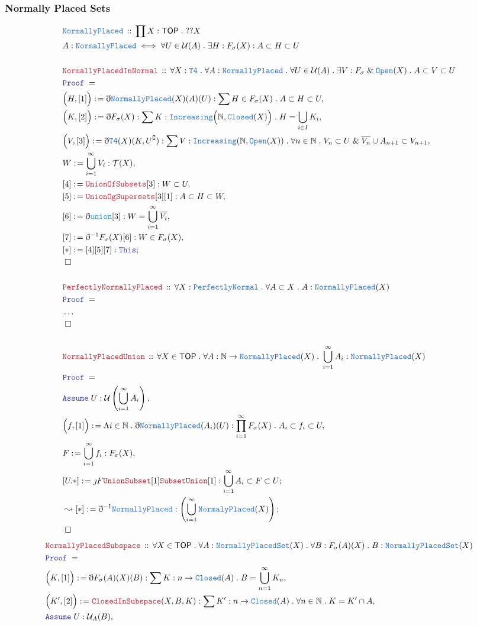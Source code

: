 \documentclass[12pt]{scrartcl}
\newcommand{\TYPE}[1]{\textcolor{NavyBlue}{\mathtt{#1}}}
\newcommand{\FUNC}[1]{\textcolor{Cerulean}{\mathtt{#1}}}
\newcommand{\LOGIC}[1]{\textcolor{Blue}{\mathtt{#1}}}
\newcommand{\THM}[1]{\textcolor{Maroon}{\mathtt{#1}}}
\renewcommand{\.}{\; . \;}
\newcommand{\de}{: \kern 0.1pc =}
\newcommand{\Act}[1]{\left( #1 \right)}
\newcommand{\Theorem}[2]{& \THM{#1} \, :: \, #2 \\ & \Proof = \\ }
\newcommand{\DeclareType}[2]{& \TYPE{#1} \, :: \, #2 \\}
\newcommand{\DefineType}[3]{& #1 : \TYPE{#2} \iff #3 \\}
\newcommand{\Page}[1]{ \begin{align*} #1 \end{align*}   }
\newcommand{ \bd }{ \ByDef }
\newcommand{\NoProof}{ & \ldots \\ \EndProof}
\renewcommand{\And}{\; \& \;}
\newcommand{\Nat}{\mathbb{N} }
\renewcommand{\c}{\complement}
\newcommand{\Say}[3]{& #1 \de #2 : #3, \\}
\newcommand{\Conclude}[3]{& #1 \de #2 : #3; \\}
\newcommand{\DeriveConclude}[3]{& \leadsto #1 \de #2 : #3 ; \\}
\newcommand{\Assume}[2]{& \LOGIC{Assume} \; #1 : #2, \\}
\newcommand{\QED}{\; \square}
\newcommand{\EndProof}{& \QED \\}
\newcommand{\ByDef}{\eth}
\newcommand{\ByConstr}{\jmath}
\newcommand{\Proof}{\LOGIC{Proof} \; }
\newcommand{\PN}{\TYPE{PerfectlyNormal}}
\newcommand{\TOP}{\mathsf{TOP}}
\newcommand{\T}{\mathcal{T}}
\renewcommand{\U}{\mathcal{U}}
\begin{document}
\subsubsection{Normally Placed Sets}
\Page{
	\DeclareType{NormallyPlaced}{\prod X : \TOP \. ??X}
	\DefineType{A}{NormallyPlaced}
	{
		\forall U \in \U(A) \.
		\exists H : F_\sigma(X) :
		A \subset H \subset U
	}
	\\
	\Theorem{NormallyPlacedInNormal}
	{
		\forall X : \TYPE{T4} \.
		\forall A : \TYPE{NormallyPlaced} \.
		\forall U \in \U(A) \.
		\exists V : F_\sigma \And \TYPE{Open}(X) \.
		A \subset V \subset U
	}
	\Say{\Big(H,[1]\Big)}{\bd \TYPE{NormallyPlaced}(X)(A)(U)}
	{ \sum H \in F_\sigma(X) \. A \subset H \subset U}
	\Say{\Big(K,[2] \Big)}{ \bd F_\sigma(X)}
	{
		\sum K : \TYPE{Increasing}\Big(\Nat, \TYPE{Closed}(X)\Big) 
		\.
		H = \bigcup_{i \in I} K_i
	}
	\Say{\Big(V,[3]\Big)}{ \bd \TYPE{T4}(X)(K, U^\c)   }
	{ 
		\sum  V : \TYPE{Increasing}(\Nat, \TYPE{Open}(X))  \.    
		\forall n \in \Nat \.   V_n \subset U \And  \overline{V_n} \cup A_{n+1} \subset V_{n+1}
	}
	\Say{W}{\bigcup^\infty_{i=1} V_i}{\T(X)}
	\Say{[4]}{\THM{UnionOfSubsets}[3]}{W \subset U}
	\Say{[5]}{\THM{UnionOgSupersets}[3][1]}{A \subset H \subset W}
	\Say{[6]}{\bd \FUNC{union}[3]}{ W = \bigcup^\infty_{i=1} \overline{V_i}  }
	\Say{[7]}{\bd^{-1} F_\sigma(X)[6]}{ W \in F_\sigma(X) }
	\Conclude{[*]}{[4][5][7]}{ \LOGIC{This}  }
	\EndProof
	\\
	\Theorem{PerfectlyNormallyPlaced}
	{
		\forall X : \PN \.
		\forall A \subset X \.
		A : \TYPE{NormallyPlaced}(X)
	}
	\NoProof
	\\
	\Theorem{NormallyPlacedUnion}
	{
		\forall X \in \TOP \.
		\forall A : \Nat \to \TYPE{NormallyPlaced}(X) \.
		\bigcup^\infty_{i=1} A_i : \TYPE{NormallyPlaced}(X)
	}
	\Assume{U}{\U\Act{\bigcup^\infty_{i=1} A_i}}
	\Say{\Big(f,[1]\Big)}{\Lambda i \in \Nat \. \bd \TYPE{NormallyPlaced}(A_i)(U) }
	{
		\prod^\infty_{i=1} F_\sigma(X) \. A_i \subset  f_i \subset U
	}
	\Say{F}{\bigcup^\infty_{i=1} f_i}{F_\sigma(X)}
	\Conclude{[U.*]}{\ByConstr F \THM{UnionSubset}[1]\THM{SubsetUnion}[1]}
	{
		\bigcup^\infty_{i=1} A_i \subset F \subset U
	}
	\DeriveConclude{[*]}{\bd^{-1} \TYPE{NormallyPlaced}}{\Act{\bigcup^\infty_{i=1} \TYPE{NormalyPlaced}(X)} }
	\EndProof
}\Page{
	\Theorem{NormallyPlacedSubspace}
	{
		\forall X \in \TOP \.
		\forall A : \TYPE{NormallyPlacedSet}(X) \.
		\forall B : F_\sigma(A)(X) \.
		B : \TYPE{NormallyPlacedSet}(X) 
	}
	\Say{\Big( K, [1] \Big)}{\bd F_\sigma(A)(X)(B)}{\sum K : n \to \TYPE{Closed}(A) \. B = \bigcup^\infty_{n=1} K_n}
	\Say{\Big(K',[2]\Big)}{\THM{ClosedInSubspace}(X,B,K)}{
		\sum K' : n \to \TYPE{Closed}(A) \. 
		\forall n \in \Nat \. K = K' \cap A 
	}
	\Assume{U}{\U_A(B)}
}
\newpage
\end{document}
